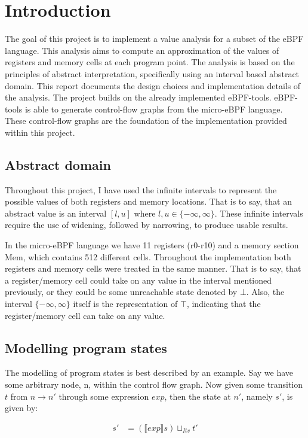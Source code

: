 \section{Introduction}\label{sec:introduction}
The goal of this project is to implement a value analysis for a subset of the
eBPF language. This analysis aims to compute an approximation of the values of
registers and memory cells at each program point. The analysis is based on the
principles of abstract interpretation, specifically using an interval based
abstract domain. This report documents the design choices and implementation
details of the analysis. The project builds on the already implemented
eBPF-tools\cite{eBPF}. eBPF-tools is able to generate control-flow graphs
from the micro-eBPF language. These control-flow graphs are the foundation of
the implementation provided within this project.

\subsection{Abstract domain}
Throughout this project, I have used the infinite intervals to represent the
possible values of both registers and memory locations. That is to say, that an
abstract value is an interval $[l, u]$ where $l, u \in \{-\infty, \infty\}$.
These infinite intervals require the use of widening, followed by narrowing, to
produce usable results.

In the micro-eBPF language we have 11 registers (r0-r10) and a memory section
Mem, which contains 512 different cells. Throughout the implementation both
registers and memory cells were treated in the same manner. That is to say,
that a register/memory cell could take on any value in the interval mentioned
previously, or they could be some unreachable state denoted by $\bot$. Also,
the interval $\{-\infty, \infty\}$ itself is the representation of $\top$,
indicating that the register/memory cell can take on any value.

\subsection{Modelling program states}
The modelling of program states is best described by an example. Say we have
some arbitrary node, n, within the control flow graph. Now given some
transition $t$ from $n \to n'$ through some expression $exp$, then the state at
$n'$, namely $s'$, is given by:

\begin{align}
  s' &= (\llbracket exp \rrbracket s) \sqcup_{Itv} t' \label{eq:1}
\end{align}

